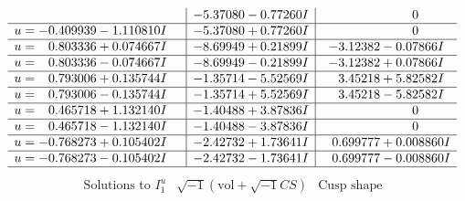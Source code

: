 \documentclass[1p]{elsarticle_modified}
\theoremstyle{definition}
\newcommand{\I}{\sqrt{-1}}
\begin{document}
$$\begin{array}{c|c|c}
 & -5.37080 - 0.77260 I & \phantom{-0.000000 } 0 \\ \hline\begin{aligned}
u &= -0.409939 - 1.110810 I\end{aligned}
 & -5.37080 + 0.77260 I & \phantom{-0.000000 } 0 \\ \hline\begin{aligned}
u &= \phantom{-}0.803336 + 0.074667 I\end{aligned}
 & -8.69949 + 0.21899 I & -3.12382 - 0.07866 I \\ \hline\begin{aligned}
u &= \phantom{-}0.803336 - 0.074667 I\end{aligned}
 & -8.69949 - 0.21899 I & -3.12382 + 0.07866 I \\ \hline\begin{aligned}
u &= \phantom{-}0.793006 + 0.135744 I\end{aligned}
 & -1.35714 - 5.52569 I & \phantom{-}3.45218 + 5.82582 I \\ \hline\begin{aligned}
u &= \phantom{-}0.793006 - 0.135744 I\end{aligned}
 & -1.35714 + 5.52569 I & \phantom{-}3.45218 - 5.82582 I \\ \hline\begin{aligned}
u &= \phantom{-}0.465718 + 1.132140 I\end{aligned}
 & -1.40488 + 3.87836 I & \phantom{-0.000000 } 0 \\ \hline\begin{aligned}
u &= \phantom{-}0.465718 - 1.132140 I\end{aligned}
 & -1.40488 - 3.87836 I & \phantom{-0.000000 } 0 \\ \hline\begin{aligned}
u &= -0.768273 + 0.105402 I\end{aligned}
 & -2.42732 + 1.73641 I & \phantom{-}0.699777 + 0.008860 I \\ \hline\begin{aligned}
u &= -0.768273 - 0.105402 I\end{aligned}
 & -2.42732 - 1.73641 I & \phantom{-}0.699777 - 0.008860 I\\
 \hline 
 \end{array}$$\newpage$$\begin{array}{c|c|c}  
\text{Solutions to }I^u_{1}& \I (\text{vol} + \sqrt{-1}CS) & \text{Cusp shape}\\
 \hline 
\begin{aligned}

\end{aligned}
\end{array}$$
\end{document}
